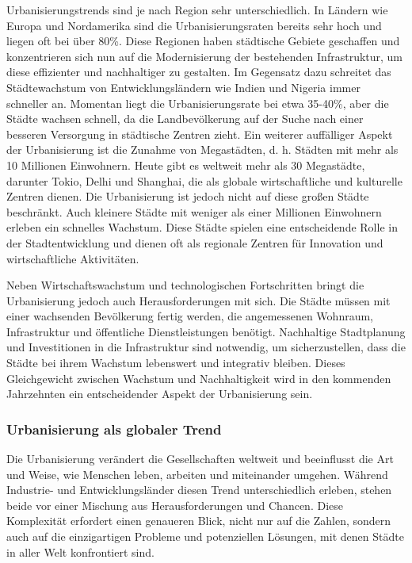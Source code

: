\documentclass[conference,compsoc,final,a4paper, onecolumn, 11pt]{IEEEtran}
\begin{document}
Urbanisierungstrends sind je nach Region sehr unterschiedlich. 
In Ländern wie Europa und Nordamerika sind die Urbanisierungsraten bereits sehr hoch und liegen oft bei über 80\%. 
Diese Regionen haben städtische Gebiete geschaffen und konzentrieren sich nun auf die Modernisierung der bestehenden Infrastruktur, um diese effizienter und nachhaltiger zu gestalten. 
Im Gegensatz dazu schreitet das Städtewachstum von  Entwicklungsländern wie Indien und Nigeria immer schneller an. 
Momentan liegt die Urbanisierungsrate bei etwa 35-40\%, aber die Städte wachsen schnell, da die Landbevölkerung auf der Suche nach einer besseren Versorgung in städtische Zentren zieht. \autocite[S. 6ff]{Taubenbock2015-pj}
Ein weiterer auffälliger Aspekt der Urbanisierung ist die Zunahme von Megastädten, d. h. Städten mit mehr als 10 Millionen Einwohnern. 
Heute gibt es weltweit mehr als 30 Megastädte, darunter Tokio, Delhi und Shanghai, die als globale wirtschaftliche und kulturelle Zentren dienen. \autocite[S. 50]{Taubenbock2015-pj}
Die Urbanisierung ist jedoch nicht auf diese großen Städte beschränkt. 
Auch kleinere Städte mit weniger als einer Millionen Einwohnern erleben ein schnelles Wachstum. 
Diese Städte spielen eine entscheidende Rolle in der Stadtentwicklung und dienen oft als regionale Zentren für Innovation und wirtschaftliche Aktivitäten.

Neben Wirtschaftswachstum und technologischen Fortschritten bringt die Urbanisierung jedoch auch Herausforderungen mit sich. 
Die Städte müssen mit einer wachsenden Bevölkerung fertig werden, die angemessenen Wohnraum, Infrastruktur und öffentliche Dienstleistungen benötigt. 
Nachhaltige Stadtplanung und Investitionen in die Infrastruktur sind notwendig, um sicherzustellen, dass die Städte bei ihrem Wachstum lebenswert und integrativ bleiben. \autocite[S. 13ff]{Zhang2015-vv}
Dieses Gleichgewicht zwischen Wachstum und Nachhaltigkeit wird in den kommenden Jahrzehnten ein entscheidender Aspekt der Urbanisierung sein. 

\subsubsection{Urbanisierung als globaler Trend}
Die Urbanisierung verändert die Gesellschaften weltweit und beeinflusst die Art und Weise, wie Menschen leben, arbeiten und miteinander umgehen. 
Während Industrie- und Entwicklungsländer diesen Trend unterschiedlich erleben, stehen beide vor einer Mischung aus Herausforderungen und Chancen. 
Diese Komplexität erfordert einen genaueren Blick, nicht nur auf die Zahlen, sondern auch auf die einzigartigen Probleme und potenziellen Lösungen, mit denen Städte in aller Welt konfrontiert sind.
\end{document}
